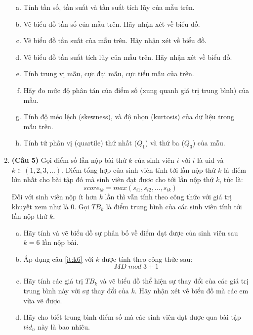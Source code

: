 \documentclass[12pt,a4paper]{article}  %
\begin{document}
\begin{enumerate}
\begin{enumerate}[a)]
  \item Tính tần số, tần suất và tần suất tích lũy của mẫu trên.
  \item Vẽ biểu đồ tần số của mẫu trên. Hãy nhận xét về biểu đồ.
  \item Vẽ biểu đồ tần suất của mẫu trên. Hãy nhận xét về biểu đồ.
  \item Vẽ biểu đồ tần suất tích lũy của mẫu trên. Hãy nhận xét về biểu đồ.
  \item Tính trung vị mẫu, cực đại mẫu, cực tiểu mẫu của trên.
  \item Hãy đo mức độ phân tán của điểm số (xung quanh giá trị trung bình) của  mẫu.
  \item  Tính độ méo lệch (skewness), và độ nhọn (kurtosis) của dữ liệu trong mẫu trên.
  \item Tính tứ phân vị (quartile) thứ nhất ($Q_1$) và thứ ba ($Q_3$) của mẫu.
    \end{enumerate}
              
\item \textbf{(Câu 5)} Gọi điểm số lần nộp bài thứ $k$ của sinh viên $i$ với $i$ là uid và $k \in (1, 2, 3, ...)$. Điểm tổng hợp của sinh viên tính tới lần nộp thứ $k$ là điểm lớn nhất cho bài tập đó mà sinh viên đạt được cho tới lần nộp thứ $k$, tức là:
    $$score_{ik} = max(s_{i1}, s_{i2}, ..., s_{ik})$$
    Đối với sinh viên nộp ít hơn $k$ lần thì vẫn tính theo công thức với giá trị khuyết xem như là 0. Gọi $TB_k$ là điểm trung bình của các sinh viên tính tới lần nộp thứ $k$.
    
      \begin{enumerate}[a)]
      \item \label{it:k6} Hãy tính và vẽ biểu đồ sự phân bố về điểm đạt được của sinh viên sau $k=6$ lần nộp bài.
      \item Áp dụng câu \ref{it:k6} với $k$ được tính theo công thức sau: $$MD \; mod \; 3 + 1  $$
      \item Hãy tính các giá trị $TB_k$ và vẽ biểu đồ thể hiện sự thay đổi của các giá trị trung bình này với sự thay đổi của $k$. Hãy nhận xét về biểu đồ mà các em vừa vẽ được.
      \item Hãy cho biết trung bình điểm số mà các sinh viên đạt được qua bài tập $tid_n$ này là bao nhiêu.
    \end{enumerate}
    


\end{enumerate}
\end{document}
